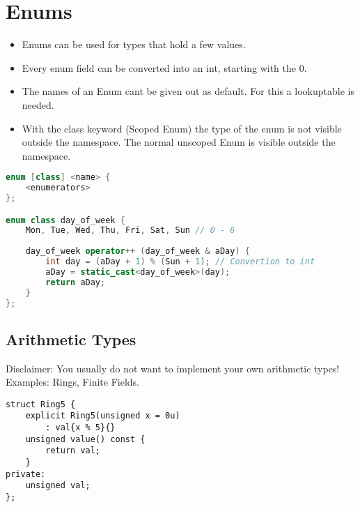 
\section{Enums}
\begin{itemize}
  \itemsep -0.5em 
  \item Enums can be used for types that hold a few values.
  \item Every enum field can be converted into an int, starting with the 0. 
  \item The names of an Enum cant be given out as default. For this a lookuptable is needed.
  \item With the class keyword (Scoped Enum) the type of the enum is not visible outside the namespace. The normal unscoped Enum is visible outside the namespace.
\end{itemize}

\begin{lstlisting}[language=C++]
enum [class] <name> { 
	<enumerators>
};

enum class day_of_week {
	Mon, Tue, Wed, Thu, Fri, Sat, Sun // 0 - 6
	
	day_of_week operator++ (day_of_week & aDay) {
		int day = (aDay + 1) % (Sun + 1); // Convertion to int
		aDay = static_cast<day_of_week>(day);
		return aDay;
	}
};
\end{lstlisting}

\subsection{Arithmetic Types}
Disclaimer: You usually do not want to implement your own arithmetic types! Examples: Rings, Finite Fields.

\begin{lstlisting}
struct Ring5 {
	explicit Ring5(unsigned x = 0u)
		: val{x % 5}{} 
	unsigned value() const {
		return val; 
	}
private:
	unsigned val;
};
\end{lstlisting}


\pagebreak


